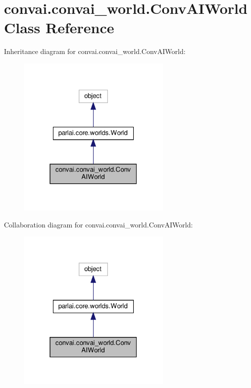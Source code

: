 \hypertarget{classconvai_1_1convai__world_1_1ConvAIWorld}{}\section{convai.\+convai\+\_\+world.\+Conv\+A\+I\+World Class Reference}
\label{classconvai_1_1convai__world_1_1ConvAIWorld}


Inheritance diagram for convai.\+convai\+\_\+world.\+Conv\+A\+I\+World\+:
\nopagebreak
\begin{figure}[H]
\begin{center}
\leavevmode
\includegraphics[width=211pt]{classconvai_1_1convai__world_1_1ConvAIWorld__inherit__graph}
\end{center}
\end{figure}


Collaboration diagram for convai.\+convai\+\_\+world.\+Conv\+A\+I\+World\+:
\nopagebreak
\begin{figure}[H]
\begin{center}
\leavevmode
\includegraphics[width=211pt]{classconvai_1_1convai__world_1_1ConvAIWorld__coll__graph}
\end{center}
\end{figure}
